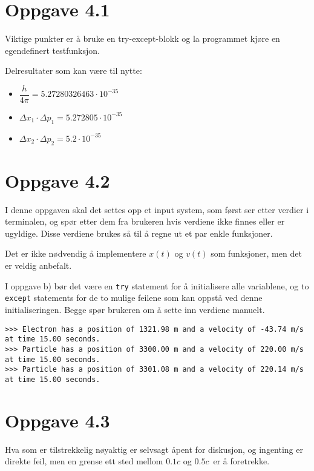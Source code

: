 \documentclass[10pt,a4paper]{article}
\begin{document}
\section*{Oppgave 4.1}
Viktige punkter er å bruke en try-except-blokk og la programmet kjøre en egendefinert testfunksjon.

Delresultater som kan være til nytte:
\begin{itemize}
	\item $\dfrac{h}{4\pi} = 5.27280326463\cdot 10^{-35}$
	\item $\Delta x_1\cdot\Delta p_1 = 5.272805\cdot 10^{-35}$
	\item $\Delta x_2 \cdot \Delta p_2 = 5.2 \cdot 10^{-35}$
\end{itemize}




\newpage
\section*{Oppgave 4.2}
I denne oppgaven skal det settes opp et input system, som først ser etter verdier i terminalen, og spør etter dem fra brukeren hvis verdiene ikke finnes eller er ugyldige. Disse verdiene brukes så til å regne ut et par enkle funksjoner.

Det er ikke nødvendig å implementere $x(t)$ og $v(t)$ som funksjoner, men det er veldig anbefalt.

I oppgave b) bør det være en \texttt{try} statement for å initialisere alle variablene, og to \texttt{except} statements for de to mulige feilene som kan oppstå ved denne initialiseringen. Begge spør brukeren om å sette inn verdiene manuelt.



\begin{verbatim}
>>> Electron has a position of 1321.98 m and a velocity of -43.74 m/s at time 15.00 seconds.
>>> Particle has a position of 3300.00 m and a velocity of 220.00 m/s at time 15.00 seconds.
>>> Particle has a position of 3301.08 m and a velocity of 220.14 m/s at time 15.00 seconds.
\end{verbatim}





\newpage
\section*{Oppgave 4.3}
Hva som er tilstrekkelig nøyaktig er selvsagt åpent for diskusjon, og ingenting er direkte feil, men en grense ett sted mellom $0.1c$ og $0.5c$ er å foretrekke.
\end{document}
